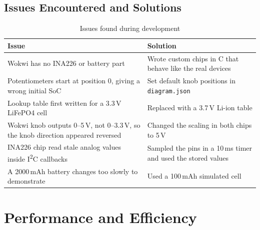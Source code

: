\documentclass[12pt,a4paper,oneside]{report}
\begin{document}
\section{Issues Encountered and Solutions}
\begin{table}[H]
\centering
\caption{Issues found during development}
\label{tab:issues}
\begin{tabularx}{\linewidth}{XX}
\toprule
\textbf{Issue} & \textbf{Solution} \\
\midrule
Wokwi has no INA226 or battery part & Wrote custom chips in C that behave like the real devices \\
Potentiometers start at position 0, giving a wrong initial SoC & Set default knob positions in \texttt{diagram.json} \\
Lookup table first written for a 3.3\,V LiFePO4 cell & Replaced with a 3.7\,V Li-ion table \\
Wokwi knob outputs 0--5\,V, not 0--3.3\,V, so the knob direction appeared reversed & Changed the scaling in both chips to 5\,V \\
INA226 chip read stale analog values inside I\textsuperscript{2}C callbacks & Sampled the pins in a 10\,ms timer and used the stored values \\
A 2000\,mAh battery changes too slowly to demonstrate & Used a 100\,mAh simulated cell \\
\bottomrule
\end{tabularx}
\end{table}

\chapter{Performance and Efficiency}\label{ch:perf}
\end{document}
